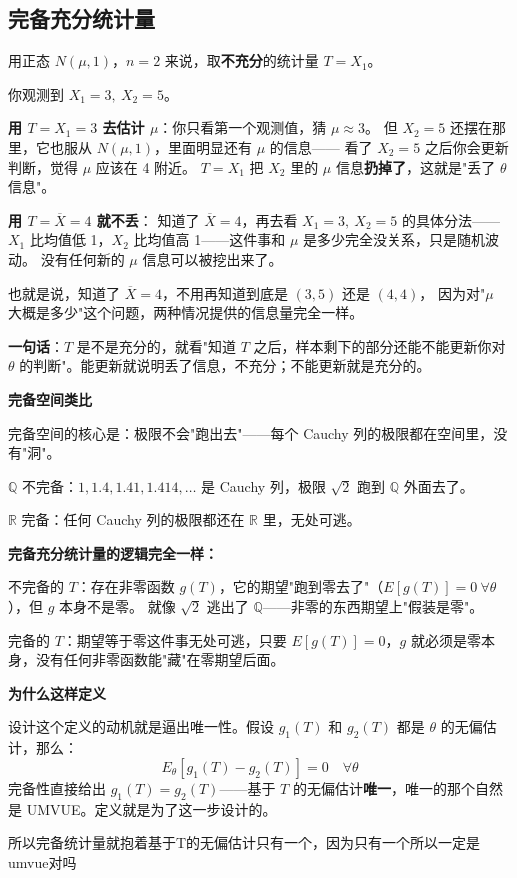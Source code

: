 \subsection{完备充分统计量}
\begin{note}[充分统计量不能丢信息]
    用正态 $N(\mu, 1)$，$n=2$ 来说，取\textbf{不充分}的统计量 $T = X_1$。

你观测到 $X_1 = 3,\ X_2 = 5$。

\textbf{用 $T = X_1 = 3$ 去估计 $\mu$}：你只看第一个观测值，猜 $\mu \approx 3$。
但 $X_2 = 5$ 还摆在那里，它也服从 $N(\mu, 1)$，里面明显还有 $\mu$ 的信息——
看了 $X_2 = 5$ 之后你会更新判断，觉得 $\mu$ 应该在 4 附近。
$T = X_1$ 把 $X_2$ 里的 $\mu$ 信息\textbf{扔掉了}，这就是"丢了 $\theta$ 信息"。

\textbf{用 $T = \overline{X} = 4$ 就不丢}：
知道了 $\overline{X} = 4$，再去看 $X_1 = 3,\ X_2 = 5$ 的具体分法——
$X_1$ 比均值低 1，$X_2$ 比均值高 1——这件事和 $\mu$ 是多少完全没关系，只是随机波动。
没有任何新的 $\mu$ 信息可以被挖出来了。

也就是说，知道了 $\overline{X} = 4$，不用再知道到底是 $(3,5)$ 还是 $(4,4)$，
因为对"$\mu$ 大概是多少"这个问题，两种情况提供的信息量完全一样。

\textbf{一句话}：$T$ 是不是充分的，就看"知道 $T$ 之后，样本剩下的部分还能不能更新你对 $\theta$ 的判断"。能更新就说明丢了信息，不充分；不能更新就是充分的。
\end{note}
\begin{note}
\textbf{完备空间类比}

完备空间的核心是：极限不会"跑出去"——每个 Cauchy 列的极限都在空间里，没有"洞"。

$\mathbb{Q}$ 不完备：$1, 1.4, 1.41, 1.414, \ldots$ 是 Cauchy 列，极限 $\sqrt{2}$ 跑到 $\mathbb{Q}$ 外面去了。

$\mathbb{R}$ 完备：任何 Cauchy 列的极限都还在 $\mathbb{R}$ 里，无处可逃。

\textbf{完备充分统计量的逻辑完全一样：}

不完备的 $T$：存在非零函数 $g(T)$，它的期望"跑到零去了"（$E[g(T)]=0\ \forall\theta$），但 $g$ 本身不是零。
就像 $\sqrt{2}$ 逃出了 $\mathbb{Q}$——非零的东西期望上"假装是零"。

完备的 $T$：期望等于零这件事无处可逃，只要 $E[g(T)]=0$，$g$ 就必须是零本身，没有任何非零函数能"藏"在零期望后面。

\textbf{为什么这样定义}

设计这个定义的动机就是逼出唯一性。假设 $g_1(T)$ 和 $g_2(T)$ 都是 $\theta$ 的无偏估计，那么：
$$E_\theta[g_1(T) - g_2(T)] = 0 \quad \forall\theta$$
完备性直接给出 $g_1(T) = g_2(T)$——基于 $T$ 的无偏估计\textbf{唯一}，唯一的那个自然是 UMVUE。定义就是为了这一步设计的。
\end{note}
\begin{dxtips}
    所以完备统计量就抱着基于T的无偏估计只有一个，因为只有一个所以一定是umvue对吗
\end{dxtips}
